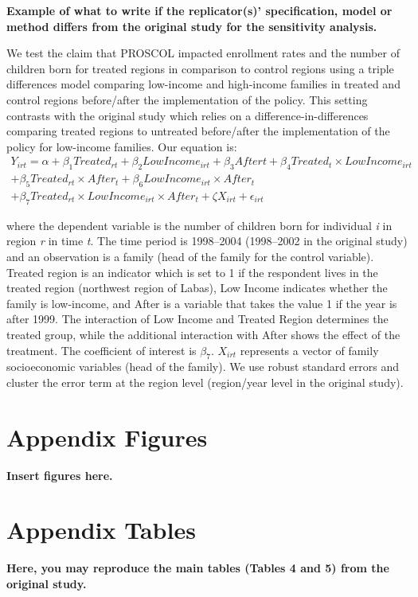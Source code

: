 \documentclass[12pt,a4paper]{article}
\begin{document}
\textbf{Example of what to write if the replicator(s)’ specification, model or method differs from the original study for the sensitivity analysis.}

We test the claim that PROSCOL impacted enrollment rates and the number of children born for treated regions in comparison to control regions using a triple differences model comparing low-income and high-income families in treated and control regions before/after the implementation of the policy. This setting contrasts with the original study which relies on a difference-in-differences comparing treated regions to untreated before/after the implementation of the policy for low-income families. Our equation is:
\begin{multline}
Y_{irt} = \alpha + \beta_{1} Treated_{rt} + \beta_{2} LowIncome_{irt} + \beta_{3} After{t} +  \beta_{4} Treated_{t} \times LowIncome_{irt} \\ +  \beta_{5} Treated_{rt} \times After_{t} +  \beta_{6} LowIncome_{irt} \times After_{t} \\ +  \beta_{7} Treated_{rt} \times LowIncome_{irt} \times After_{t} + \zeta X_{irt} + \epsilon_{irt}
\end{multline}

where the dependent variable is the number of children born for individual \textit{i} in region \textit{r} in time \textit{t}. The time period is 1998--2004 (1998--2002 in the original study) and an observation is a family (head of the family for the control variable). Treated region is an indicator which is set to 1 if the respondent lives in the treated region (northwest region of Labas), Low Income indicates whether the family is low-income, and After is a variable that takes the value 1 if the year is after 1999.  The interaction of Low Income and Treated Region determines the treated group, while the additional interaction with After shows the effect of the treatment. The coefficient of interest is $\beta_{7}$. $X_{irt}$ represents a vector of family socioeconomic variables (head of the family). We use robust standard errors and cluster the error term at the region level (region/year level in the original study).


\renewcommand{\thefigure}{A\arabic{figure}}
\renewcommand{\thetable}{A\arabic{table}}
\setcounter{figure}{0}
\setcounter{table}{0}


%


\section{Appendix Figures}

\textbf{Insert figures here.}

\section{Appendix Tables}


\textbf{Here, you may reproduce the main tables (Tables 4 and 5) from the original study.}
\end{document}
